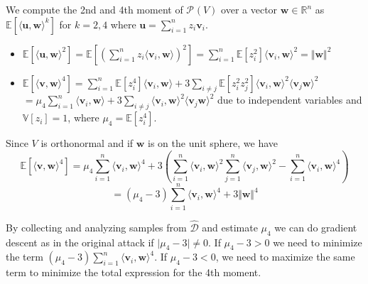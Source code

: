 \documentclass[12 pt]{article}        	%
\newcommand{\PP}[2][]{\mathcal{P}_{#1}(\mat{#2})}
\newcommand{\mat}[1]{\mathit{#1}}
\renewcommand{\vec}[1]{\mathbf{#1}}
\newcommand{\bb}[1]{\mathbb{#1}}
\newcommand{\dgdi}{\widehat{\mathcal{D}}}
\renewcommand{\dot}[2]{\langle \vec{#1}, \vec{#2} \rangle}
\begin{document}
We compute the 2nd and 4th moment of $\PP{V}$ over a vector $\vec{w} \in \bb{R}^n$ as $\bb{E}[\langle \vec{u}, \vec{w} \rangle ^k]$ for $k=2,4$ where $\vec{u} = \sum_{i=1}^{n}z_i \vec{v}_i.$ 
\begin{itemize}
    \item $\bb{E}[\langle \vec{u}, \vec{w} \rangle ^2] = \bb{E}[(\sum_{i=1}^{n} z_i \langle \vec{v}_i, \vec{w} \rangle )^2] = \sum_{i=1}^{n}\bb{E}[z_i^2]\langle \vec{v}_i, \vec{w} \rangle^2 = \Vert \vec{w} \Vert ^2$
    \item $\bb{E}[\dot{v}{w} ^4] = \sum_{i=1}^{n}\bb{E}[z_i ^4] \langle \vec{v}_i, \vec{w} \rangle  + 3\sum_{i \neq j} \bb{E}[z_i^2 z_j^2] \langle \vec{v}_i, \vec{w} \rangle ^2 \langle \vec{v}_j \vec{w} \rangle^2$ \\
        $= \mu_4 \sum_{i=1}^{n} \langle \vec{v}_i, \vec{w} \rangle + 3\sum_{i \neq j} \langle \vec{v}_i, \vec{w} \rangle ^2 \langle \vec{v}_j \vec{w} \rangle^2$
        due to independent variables and $\bb{V}[z_i] = 1$, where $\mu_4 = \bb{E}[z_i ^4]$.
\end{itemize}
Since $\mat{V}$ is orthonormal and if $\vec{w}$ is on the unit sphere, we have 
\[\bb{E}[\dot{v}{w} ^4] = \mu_4 \sum_{i=1}^{n} \langle \vec{v}_i, \vec{w} \rangle ^4 + 3(\sum_{i=1}^{n} \langle \vec{v}_i, \vec{w} \rangle^2 \sum_{j=1}^{n} \langle \vec{v}_j, \vec{w} \rangle^2 - \sum_{i=1}^{n} \langle \vec{v}_i, \vec{w} \rangle ^4)\]
\[= (\mu_4 - 3)\sum_{i=1}^{n}\langle \vec{v}_i, \vec{w} \rangle^4 + 3 \Vert \vec{w} \Vert ^4\]

By collecting and analyzing samples from $\dgdi$ and estimate $\mu_4$ we can do gradient descent as in the original attack if $\lvert \mu_4 - 3 \rvert \neq 0$.
If $\mu_4 - 3 > 0$ we need to minimize the term $(\mu_4 - 3) \sum_{i=1}^{n} \langle \vec{v}_i, \vec{w} \rangle ^4$. If $\mu_4 - 3 < 0$, we need to maximize the same term to minimize the total expression for the 4th moment.
\end{document}
